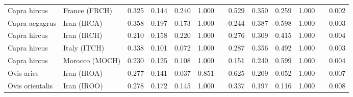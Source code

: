 \begin{center}
\begin{adjustbox}{width = 1\textwidth}
\begin{tabular}{|l|l|r|r|r|r|r|r|r|r|r|}
        Capra hircus &                   France (FRCH) &                 0.325 &                                0.144 &                0.240 &                                  1.000~~ &                 0.529 &                                0.350 &                0.259 &                                  1.000~~ &              0.002 \\
      Capra aegagrus &                     Iran (IRCA) &                 0.358 &                                0.197 &                0.173 &                                  1.000~~ &                 0.244 &                                0.387 &                0.598 &                                  1.000~~ &              0.003 \\
        Capra hircus &                     Iran (IRCH) &                 0.210 &                                0.158 &                0.220 &                                  1.000~~ &                 0.276 &                                0.309 &                0.415 &                                  1.000~~ &              0.004 \\
        Capra hircus &                    Italy (ITCH) &                 0.338 &                                0.101 &                0.072 &                                  1.000~~ &                 0.287 &                                0.356 &                0.492 &                                  1.000~~ &              0.003 \\
        Capra hircus &                  Morocco (MOCH) &                 0.230 &                                0.125 &                0.108 &                                  1.000~~ &                 0.151 &                                0.240 &                0.599 &                                  1.000~~ &              0.004 \\
          Ovis aries &                     Iran (IROA) &                 0.277 &                                0.141 &                0.037 &                                  0.851~~ &                 0.625 &                                0.209 &                0.052 &                                  1.000~~ &              0.007 \\
     Ovis orientalis &                     Iran (IROO) &                 0.278 &                                0.172 &                0.145 &                                  1.000~~ &                 0.337 &                                0.197 &                0.116 &                                  1.000~~ &              0.008 \\

\end{tabular}
\end{adjustbox}
\end{center}
